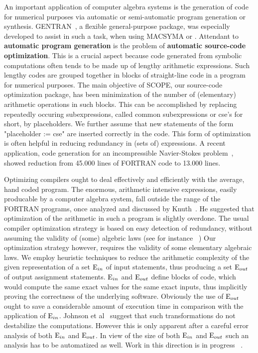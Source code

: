 An important application of computer algebra systems is the generation
of code for numerical purposes via automatic or semi-automatic program
generation or synthesis.
GENTRAN~\cite{Gates:84,Gates:85,Gates:86,Gates:91}, a flexible general-purpose
package, was especially developed to assist in such a task, when using
MACSYMA or {\REDUCE}.
Attendant to {\bf automatic program generation} is the problem
of {\bf automatic source-code optimization}.
This is a crucial aspect because code
generated from symbolic computations often tends to be made up of
lengthy arithmetic expressions.
Such lengthy codes are grouped together in
blocks of straight-line code in a program for numerical purposes. The
main objective of SCOPE, our source-code optimization package, has been
minimization of the number of (elementary) arithmetic operations in such
blocks. This can be accomplished by replacing repeatedly occuring
subexpressions, called common subexpressions or cse's for short,
by placeholders. We further assume that new statements of the form
"placeholder := cse" are inserted correctly in the code. This
form of optimization is often helpful in reducing redundancy in (sets of)
expressions. A recent application, code generation for an
incompressible Navier-Stokes problem~\cite{Goldman:95}, showed reduction
from 45.000 lines of FORTRAN code to 13.000 lines.

Optimizing compilers ought to deal effectively and efficiently with
the average, hand coded program. The enormous, arithmetic intensive
expressions, easily producable by a computer algebra system, fall
outside the range of the FORTRAN programs, once analyzed and discussed
by Knuth~\cite{Knuth:71}. He suggested that optimization of the arithmetic in
such a program is slightly overdone. The usual compiler optimization strategy
is based on easy detection of redundancy, without assuming the validity of
(some) algebric laws (see for instance ~\cite{Gonzales})
Our optimization strategy however, requires the validity of
some elementary algebraic laws. We employ heuristic techniques to
reduce the arithmetic complexity of the given representation of a set
${\rm E}_{in}$ of input statements, thus producing a set
${\rm E}_{out}$ of output assignment statements.
${\rm E}_{in}$ and ${\rm E}_{out}$ define blocks of
code, which would compute the same exact values for the same exact
inputs, thus implicitly proving the correctness of the underlying
software.  Obviously the use of ${\rm E}_{out}$ ought to save a considerable
amount of execution time in comparison with the application of ${\rm
E}_{in}$.  Johnson et al~\cite{Johnson:79} suggest that such
transformations do not destabilize the computations.  However this is only
apparent after a careful error analysis of both ${\rm E}_{in}$ and ${\rm
E}_{out}$.  In view of the size of both ${\rm E}_{in}$ and ${\rm E}_{out}$
such an analysis has to be automatized as well.  Work in this direction is
in progress ~\cite{Hulshof,Molenkamp:91,Molenkamp:94}.

